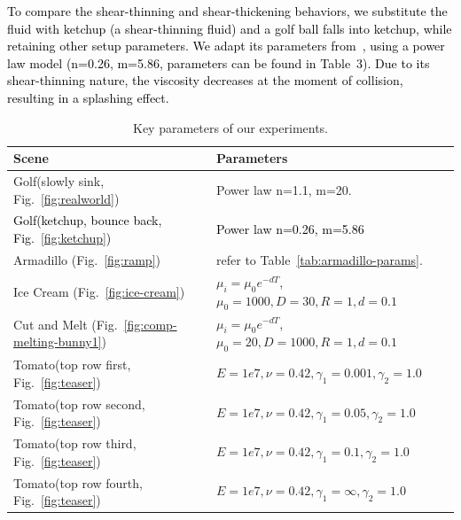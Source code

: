 \documentclass[10pt,journal,compsoc]{IEEEtran}
\newcommand{\revised}[1]{{\textcolor{black}{#1}}}
\begin{document}
\revised{ To compare the shear-thinning and shear-thickening behaviors, we substitute the fluid with ketchup (a shear-thinning fluid) and a golf ball falls into ketchup, while retaining other setup parameters. We adapt its parameters from~\cite{Bottiglieri1991}, using a power law model (n=0.26, m=5.86, parameters can be found in Table~3). Due to its shear-thinning nature, the viscosity decreases at the moment of collision, resulting in a splashing effect.}


\begin{table}[htbp]
	\caption{Key parameters of our experiments.}
	\centering
	\begin{tabular}{ll}
		\toprule\label{tab:parameters}
		Scene                                                            & Parameters                                                                                \\
		\midrule
		Golf(slowly sink, Fig.~\ref{fig:realworld})                      & Power law n=1.1, m=20.                                                                    \\
		\revised{Golf(ketchup, bounce back, Fig.~\ref{fig:ketchup})} & \revised{Power law n=0.26, m=5.86~\cite{Bottiglieri1991}}                                  \\
		Armadillo (Fig.~\ref{fig:ramp})                                  & refer to Table~\ref{tab:armadillo-params}.                                                \\
		Ice Cream (Fig.~\ref{fig:ice-cream})                             & $\mu_i = \mu_0 e^{-d T}$, $\mu_0=1000, D=30, R=1, d=0.1$                                  \\
		Cut and Melt (Fig.~\ref{fig:comp-melting-bunny1})                & $\mu_i = \mu_0 e^{-d T}$, $\mu_0=20, D=1000, R=1, d=0.1$                                  \\
		Tomato(top row first, Fig.~\ref{fig:teaser})                     & $E=1e7, \nu=0.42, \gamma_1=0.001, \gamma_2 = 1.0$                                         \\
		Tomato(top row second, Fig.~\ref{fig:teaser})                    & $E=1e7, \nu=0.42, \gamma_1=0.05, \gamma_2 = 1.0$                                          \\
		Tomato(top row third, Fig.~\ref{fig:teaser})                     & $E=1e7, \nu=0.42, \gamma_1=0.1, \gamma_2 = 1.0$                                           \\
		Tomato(top row fourth, Fig.~\ref{fig:teaser})                    & $E=1e7, \nu=0.42, \gamma_1=\infty, \gamma_2 = 1.0$                                        \\

\end{tabular}
\end{table}
\end{document}

